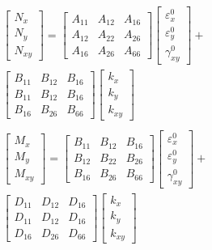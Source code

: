 \documentclass[USenglish,twocolumn]{article}
\begin{document}
\begin{equation} \label{eq:force_and_moments}
	\begin{array}{l}
	\begin{bmatrix}
		N_x \\
		N_y \\
		N_{xy}
	\end{bmatrix}
	=
	\begin{bmatrix}
		A_{11} & A_{12} & A_{16} \\
		A_{12} & A_{22} & A_{26} \\
		A_{16} & A_{26} & A_{66} 
	\end{bmatrix}
    \begin{bmatrix}
		\varepsilon_x^0 \\
        \varepsilon_y^0 \\
		\gamma_{xy}^0
    \end{bmatrix}  
	+               \\
	\begin{bmatrix}
		B_{11} & B_{12} & B_{16} \\
		B_{11} & B_{12} & B_{16} \\
		B_{16} & B_{26} & B_{66} 
	\end{bmatrix}
	\begin{bmatrix}
		k_x \\
		k_y \\
		k_{xy} 
	\end{bmatrix}  \\
	\\

	\begin{bmatrix}
		M_x \\
		M_y \\
		M_{xy}
	\end{bmatrix}
	=
	\begin{bmatrix}
		B_{11} & B_{12} & B_{16} \\
		B_{12} & B_{22} & B_{26} \\
		B_{16} & B_{26} & B_{66} 
	\end{bmatrix}
    \begin{bmatrix}
		\varepsilon_x^0 \\
        \varepsilon_y^0 \\
		\gamma_{xy}^0
    \end{bmatrix} 
	+  \\
	\begin{bmatrix}
		D_{11} & D_{12} & D_{16} \\
		D_{11} & D_{12} & D_{16} \\
		D_{16} & D_{26} & D_{66} 
	\end{bmatrix}
	\begin{bmatrix}
		k_x \\
		k_y \\
		k_{xy} 
	\end{bmatrix}
	\end{array}
\end{equation}
\end{document}
